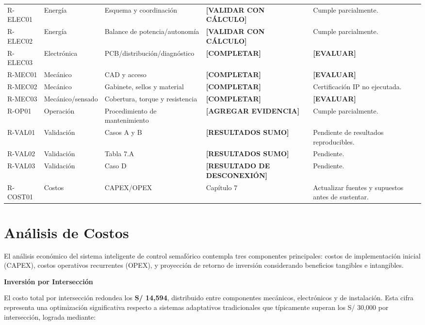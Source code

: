 \documentclass[12pt,a4paper,oneside]{report}
\begin{document}
\begin{landscape}
\begin{longtable}{@{}p{2.2cm}p{4.0cm}p{5.0cm}p{3.5cm}p{7.0cm}@{}}
R-ELEC01 & Energía & Esquema y coordinación & \textbf{[VALIDAR CON CÁLCULO]} & Cumple parcialmente.\\
R-ELEC02 & Energía & Balance de potencia/autonomía & \textbf{[VALIDAR CON CÁLCULO]} & Cumple parcialmente.\\
R-ELEC03 & Electrónica & PCB/distribución/diagnóstico & \textbf{[COMPLETAR]} & \textbf{[EVALUAR]}\\
R-MEC01 & Mecánico & CAD y acceso & \textbf{[COMPLETAR]} & \textbf{[EVALUAR]}\\
R-MEC02 & Mecánico & Gabinete, sellos y material & \textbf{[COMPLETAR]} & Certificación IP no ejecutada.\\
R-MEC03 & Mecánico/sensado & Cobertura, torque y resistencia & \textbf{[COMPLETAR]} & \textbf{[EVALUAR]}\\
R-OP01 & Operación & Procedimiento de mantenimiento & \textbf{[AGREGAR EVIDENCIA]} & Cumple parcialmente.\\
R-VAL01 & Validación & Casos A y B & \textbf{[RESULTADOS SUMO]} & Pendiente de resultados reproducibles.\\
R-VAL02 & Validación & Tabla 7.A & \textbf{[RESULTADOS SUMO]} & Pendiente.\\
R-VAL03 & Validación & Caso D & \textbf{[RESULTADO DE DESCONEXIÓN]} & Pendiente.\\
R-COST01 & Costos & CAPEX/OPEX & Capítulo 7 & Actualizar fuentes y supuestos antes de sustentar.\\
\bottomrule
\end{longtable}
\end{landscape}

\section{Análisis de Costos}\label{anuxe1lisis-de-costos}

El análisis económico del sistema inteligente de control semafórico contempla tres componentes principales: costos de implementación inicial (CAPEX), costos operativos recurrentes (OPEX), y proyección de retorno de inversión considerando beneficios tangibles e intangibles.

\textbf{Inversión por Intersección}

El costo total por intersección redondea los \textbf{S/ 14,594}, distribuido entre componentes mecánicos, electrónicos y de instalación. Esta cifra representa una optimización significativa respecto a sistemas adaptativos tradicionales que típicamente superan los S/ 30,000 por intersección, lograda mediante:
\end{document}
